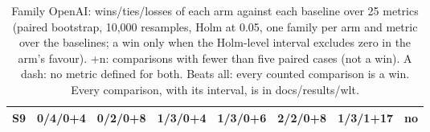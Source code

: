 \begin{table}[!t]
\begin{adjustbox}{max width=\textwidth}
\begin{tabular}{@{}lccccccc@{}}
S9 & 0/4/0+4 & 0/2/0+8 & 1/3/0+4 & 1/3/0+6 & 2/2/0+8 & 1/3/1+17 & no \\
\bottomrule
\end{tabular}
\end{adjustbox}
\caption{Family OpenAI: wins/ties/losses of each arm against each baseline over 25 metrics (paired bootstrap, 10,000 resamples, Holm at 0.05, one family per arm and metric over the baselines; a win only when the Holm-level interval excludes zero in the arm's favour). +n: comparisons with fewer than five paired cases (not a win). A dash: no metric defined for both. Beats all: every counted comparison is a win. Every comparison, with its interval, is in docs/results/wlt.}
\label{tab:wlt_openai}
\end{table}
